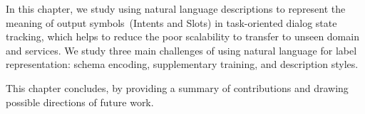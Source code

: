  In this
chapter, we study using natural language descriptions to represent the
meaning of output symbols~(Intents and Slots) in task-oriented dialog
state tracking, which helps to reduce the poor scalability to transfer
to unseen domain and services. We study three main challenges of using
natural language for label representation: schema encoding,
supplementary training, and description styles.


 This chapter
concludes, by providing a summary of contributions and drawing
possible directions of future work.


